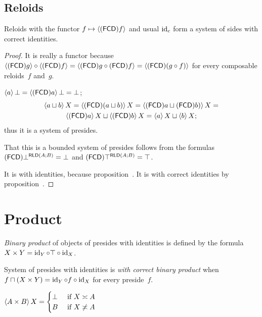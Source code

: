 \subsection{Reloids}

\begin{prop}
Reloids with the functor $f\mapsto\left\langle (\mathsf{FCD}) f\right\rangle$ and usual $\operatorname{id}_c$ form a system of sides with correct identities.
\end{prop}

\begin{proof}
It is really a functor because
$\left\langle (\mathsf{FCD}) g\right\rangle\circ\left\langle (\mathsf{FCD}) f\right\rangle = \left\langle (\mathsf{FCD}) g\circ(\mathsf{FCD}) f\right\rangle = \left\langle (\mathsf{FCD})(g\circ f)\right\rangle$
for every composable reloids~$f$ and~$g$.

$\left\langle a\right\rangle\bot = \left\langle (\mathsf{FCD}) a\right\rangle\bot = \bot$;
\begin{multline*}
\left\langle a\sqcup b\right\rangle X = \left\langle (\mathsf{FCD})(a\sqcup b)\right\rangle X = \left\langle (\mathsf{FCD}) a\sqcup(\mathsf{FCD}) b)\right\rangle X = \\
\left\langle (\mathsf{FCD}) a\right\rangle X\sqcup\left\langle (\mathsf{FCD}) b\right\rangle X = \left\langle a\right\rangle X\sqcup\left\langle b\right\rangle X;
\end{multline*}
thus it is a system of presides.

That this is a bounded system of presides follows from the formulas
$(\mathsf{FCD})\bot^{\mathsf{RLD}(A;B)}=\bot$ and $(\mathsf{FCD})\top^{\mathsf{RLD}(A;B)}=\top$.

It is with identities, because proposition~.
It is with correct identities by proposition~.
\end{proof}



\section{Product}

\begin{defn}
\emph{Binary product} of objects of presides with identities is defined by the formula $X\times Y=\operatorname{id}_Y\circ\top\circ\operatorname{id}_X$.
\end{defn}

\begin{defn}
System of presides with identities is \emph{with correct binary product} when $f\sqcap(X\times Y) = \operatorname{id}_Y\circ f\circ\operatorname{id}_X$
for every preside~$f$.
\end{defn}

\begin{prop}
$\left\langle A\times B\right\rangle X = \begin{cases}\bot&\text{ if }X\asymp A\\B&\text{ if }X\not\asymp A\end{cases}$
\end{prop}

